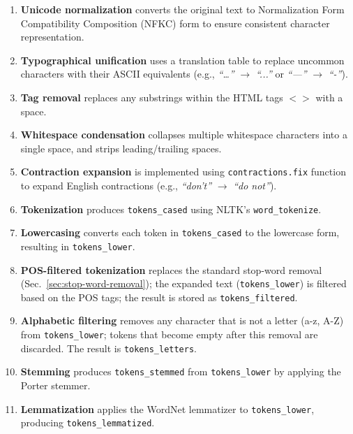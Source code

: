 \documentclass[a4paper,twoside,12pt]{book}
\newcommand{\code}[1]{\texttt{#1}}
\newcommand{\literal}[1]{\textit{``#1''}}
\begin{document}
\begin{enumerate}
	\item \textbf{Unicode normalization} converts the original text to Normalization Form Compatibility Composition (NFKC) form to ensure consistent character representation.
	
	\item \textbf{Typographical unification} uses a translation table to replace uncommon characters with their ASCII equivalents (e.g., \literal{\ldots} $\rightarrow$ \literal{...} or \literal{---} $\rightarrow$ \literal{-}).
	
	\item \textbf{Tag removal} replaces any substrings within the HTML tags $<>$ with a space.
	
	\item \textbf{Whitespace condensation} collapses multiple whitespace characters into a single space, and strips leading/trailing spaces.
	
	\item \textbf{Contraction expansion} is implemented using \code{contractions.fix} function to expand English contractions (e.g., \literal{don't} $\rightarrow$ \literal{do not}).
	
	\item \textbf{Tokenization} produces \code{tokens\_cased} using NLTK's \code{word\_tokenize}.
	
	\item \textbf{Lowercasing} converts each token in \code{tokens\_cased} to the lowercase form, resulting in \code{tokens\_lower}.
	
	\item \textbf{POS-filtered tokenization} replaces the standard stop-word removal (Sec.~\ref{sec:stop-word-removal}); the expanded text (\code{tokens\_lower}) is filtered based on the POS tags; the result is stored as \code{tokens\_filtered}.
	
	\item \textbf{Alphabetic filtering} removes any character that is not a letter (a-z, A-Z) from \code{tokens\_lower}; tokens that become empty after this removal are discarded. The result is \code{tokens\_letters}.
	
	\item \textbf{Stemming} produces \code{tokens\_stemmed} from \code{tokens\_lower} by applying the Porter stemmer.
	
	\item \textbf{Lemmatization} applies the WordNet lemmatizer to \code{tokens\_lower}, producing \code{tokens\_lemmatized}.
\end{enumerate}
\end{document}
